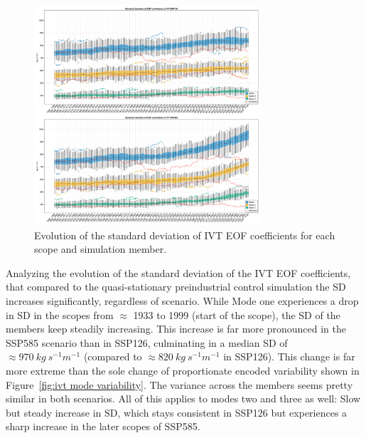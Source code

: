 \begin{figure}
  \begin{center}
    \includegraphics[width=0.75\textwidth]{figures/std_ivt_50seasons_tempmodescale_3modes.png}
  \end{center}
  \caption{Evolution of the standard deviation of IVT EOF coefficients for each scope and simulation member.}
  \label{fig:std ivt evolution}
\end{figure}

Analyzing the evolution of the standard deviation of the IVT EOF coefficients, that compared to the quasi-stationary preindustrial control simulation the SD increases significantly, regardless of scenario. 
While Mode one experiences a drop in SD in the scopes from $\approx$ 1933 to 1999 (start of the scope), the SD of the members keep steadily increasing. 
This increase is far more pronounced in the SSP585 scenario than in SSP126, culminating in a median SD of $\approx 970~kg~s^{-1} m^{-1}$ (compared to $\approx 820~kg~s^{-1}m^{-1}$ in SSP126). 
This change is far more extreme than the sole change of proportionate encoded variability shown in Figure~\ref{fig:ivt mode variability}. 
The variance across the members seems pretty similar in both scenarios. 
All of this applies to modes two and three as well: Slow but steady increase in SD, which stays consistent in SSP126 but experiences a sharp increase in the later scopes of SSP585.  



